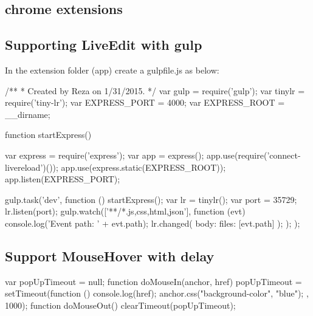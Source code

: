 \begin{appendices}
	\chapter{chrome extensions}
	\section{Supporting LiveEdit with gulp}
	\label{app:ch:gulpfile}
	In the extension folder (app) create a gulpfile.js as below:
	
	\begin{javacode}[gulpfile.js]
	/**
	* Created by Reza on 1/31/2015.
	*/
	var gulp = require('gulp');
	var tinylr = require('tiny-lr');
	var EXPRESS_PORT = 4000;
	var EXPRESS_ROOT = __dirname;
	
	function startExpress() {
		
		var express = require('express');
		var app = express();
		app.use(require('connect-livereload')());
		app.use(express.static(EXPRESS_ROOT));
		app.listen(EXPRESS_PORT);
	}
	
	gulp.task('dev', function () {
		startExpress();
		var lr = tinylr();
		var port = 35729;
		lr.listen(port);
		gulp.watch(['**/*.{js,css,html,json}'], function (evt) {
			console.log('Event path: ' + evt.path);
			lr.changed({
				body: {
					files: [evt.path]
				}
			});
		});
	});
	\end{javacode}
	\section{Support MouseHover with delay}
	\label{app:ch:hover}
	\begin{jscode}
		var popUpTimeout = null;
		function doMouseIn(anchor, href) {
			popUpTimeout = setTimeout(function () {
				console.log(href);
				anchor.css("background-color", "blue");
			}, 1000);
		}
		function doMouseOut() {
			clearTimeout(popUpTimeout);
		}		
	\end{jscode}
\end{appendices}